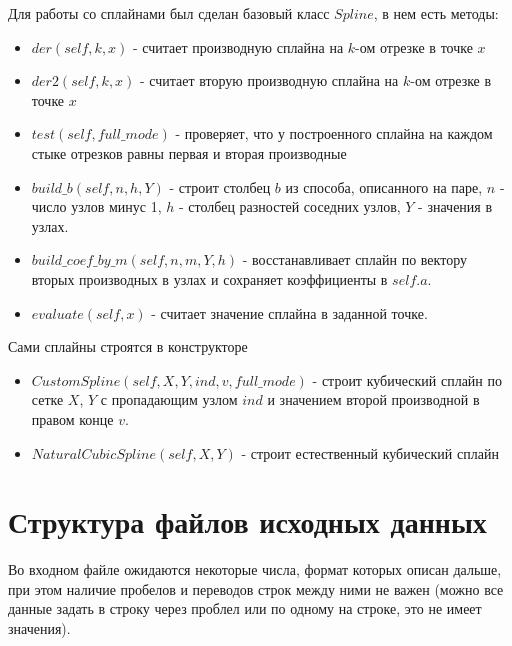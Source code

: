 \documentclass[paper=a4, fontsize=11pt]{scrartcl} %
\numberwithin{equation}{section} %
\numberwithin{figure}{section} %
\numberwithin{table}{section} %
\begin{document}
Для работы со сплайнами был сделан базовый класс $Spline$, в нем есть методы:

\begin{itemize}
	\item $der(self, k, x)$ - считает производную сплайна на $k$-ом отрезке в точке $x$
    \item $der2(self, k, x)$ - считает вторую производную сплайна на $k$-ом отрезке в точке $x$
    \item $test(self, full\_mode)$ - проверяет, что у построенного сплайна на каждом стыке отрезков равны первая и вторая производные
    \item $build\_b(self, n, h, Y)$ - строит столбец $b$ из способа, описанного на паре, $n$ - число узлов минус 1, $h$ - столбец разностей соседних узлов, $Y$ - значения в узлах.
    \item $build\_coef\_by\_m(self, n, m, Y, h)$ - восстанавливает сплайн по вектору вторых производных в узлах и сохраняет коэффициенты в $self.a$.
    \item $evaluate(self, x)$ - считает значение сплайна в заданной точке.
\end{itemize}

Сами сплайны строятся в конструкторе

\begin{itemize}
	\item $CustomSpline(self, X, Y, ind, v, full\_mode)$ - строит кубический сплайн по сетке $X$, $Y$ с пропадающим узлом $ind$ и значением второй производной в правом конце $v$.
    \item $NaturalCubicSpline(self, X, Y)$ - строит естественный кубический сплайн
\end{itemize}
	




\section{Структура файлов исходных данных}

Во входном файле ожидаются некоторые числа, формат которых описан дальше, при этом наличие пробелов и переводов строк между ними не важен (можно все данные задать в строку через проблел или по одному на строке, это не имеет значения).
\end{document}
